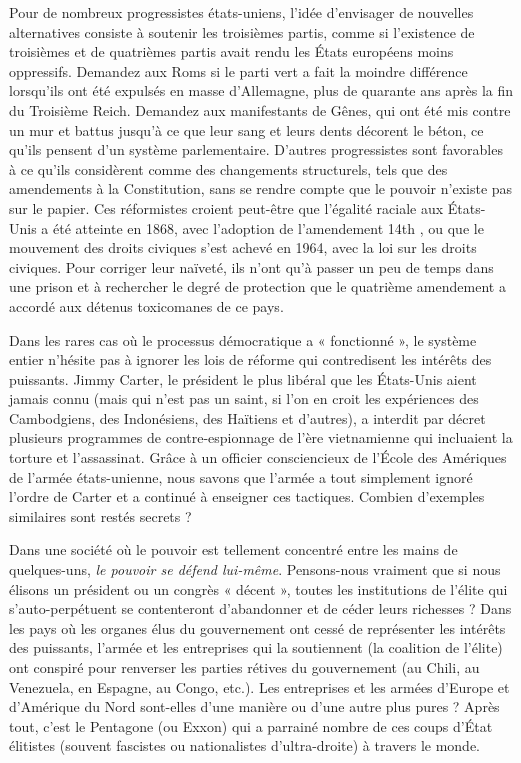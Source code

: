 Pour de nombreux progressistes états-uniens, l'idée d'envisager de nouvelles alternatives consiste à soutenir les troisièmes partis, comme si l'existence de troisièmes et de quatrièmes partis avait rendu les États européens moins oppressifs. Demandez aux Roms si le parti vert a fait la moindre différence lorsqu'ils ont été expulsés en masse d'Allemagne, plus de quarante ans après la fin du Troisième Reich. Demandez aux manifestants de Gênes, qui ont été mis contre un mur et battus jusqu'à ce que leur sang et leurs dents décorent le béton, ce qu'ils pensent d'un système parlementaire. D'autres progressistes sont favorables à ce qu'ils considèrent comme des changements structurels, tels que des amendements à la Constitution, sans se rendre compte que le pouvoir n'existe pas sur le papier. Ces réformistes croient peut-être que l'égalité raciale aux États-Unis a été atteinte en 1868, avec l'adoption de l'amendement 14th , ou que le mouvement des droits civiques s'est achevé en 1964, avec la loi sur les droits civiques. Pour corriger leur naïveté, ils n'ont qu'à passer un peu de temps dans une prison et à rechercher le degré de protection que le quatrième amendement a accordé aux détenus toxicomanes de ce pays.

Dans les rares cas où le processus démocratique a « fonctionné », le système entier n'hésite pas à ignorer les lois de réforme qui contredisent les intérêts des puissants. Jimmy Carter, le président le plus libéral que les États-Unis aient jamais connu (mais qui n'est pas un saint, si l'on en croit les expériences des Cambodgiens, des Indonésiens, des Haïtiens et d'autres), a interdit par décret plusieurs programmes de contre-espionnage de l'ère vietnamienne qui incluaient la torture et l'assassinat. Grâce à un officier consciencieux de l'École des Amériques de l'armée états-unienne, nous savons que l'armée a tout simplement ignoré l'ordre de Carter et a continué à enseigner ces tactiques. Combien d'exemples similaires sont restés secrets ?

Dans une société où le pouvoir est tellement concentré entre les mains de quelques-uns, \emph{le pouvoir se défend lui-même}. Pensons-nous vraiment que si nous élisons un président ou un congrès « décent », toutes les institutions de l'élite qui s'auto-perpétuent se contenteront d'abandonner et de céder leurs richesses ? Dans les pays où les organes élus du gouvernement ont cessé de représenter les intérêts des puissants, l'armée et les entreprises qui la soutiennent (la coalition de l'élite) ont conspiré pour renverser les parties rétives du gouvernement (au Chili, au Venezuela, en Espagne, au Congo, etc.). Les entreprises et les armées d'Europe et d'Amérique du Nord sont-elles d'une manière ou d'une autre plus pures ? Après tout, c'est le Pentagone (ou Exxon) qui a parrainé nombre de ces coups d'État élitistes (souvent fascistes ou nationalistes d'ultra-droite) à travers le monde.

